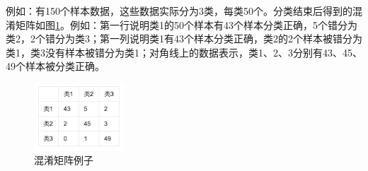 \documentclass[12pt]{article}
\begin{document}
例如：有150个样本数据，这些数据实际分为3类，每类50个。分类结束后得到的混淆矩阵如图\ref{fig:cm}。例如：第一行说明类1的50个样本有43个样本分类正确，5个错分为类2，2个错分为类3；第一列说明类1有43个样本分类正确，类2的2个样本被错分为类1，类3没有样本被错分为类1；对角线上的数据表示，类1、2、3分别有43、45、49个样本被分类正确。\newline
    \begin{figure}[!ht]
      \centering 
        \includegraphics[width=0.3\textwidth]{cm}
        \caption{混淆矩阵例子}
        \label{fig:cm}
    \end{figure}
\end{document}
